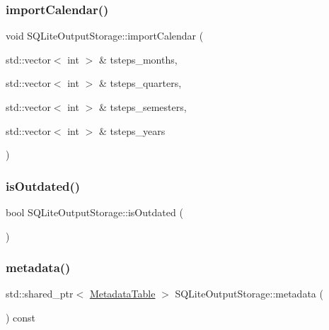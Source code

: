 \subsubsection{\texorpdfstring{importCalendar()}{importCalendar()}}
{\footnotesize\ttfamily void S\+Q\+Lite\+Output\+Storage\+::import\+Calendar (\begin{DoxyParamCaption}\item[{std\+::vector$<$ int $>$ \&}]{tsteps\+\_\+months,  }\item[{std\+::vector$<$ int $>$ \&}]{tsteps\+\_\+quarters,  }\item[{std\+::vector$<$ int $>$ \&}]{tsteps\+\_\+semesters,  }\item[{std\+::vector$<$ int $>$ \&}]{tsteps\+\_\+years }\end{DoxyParamCaption})}

\mbox{\label{class_s_q_lite_output_storage_adad2107c8e0ed61de81afa4bad915679}} 
\subsubsection{\texorpdfstring{isOutdated()}{isOutdated()}}
{\footnotesize\ttfamily bool S\+Q\+Lite\+Output\+Storage\+::is\+Outdated (\begin{DoxyParamCaption}{ }\end{DoxyParamCaption})\hspace{0.3cm}{\ttfamily [inline]}}

\mbox{\label{class_s_q_lite_output_storage_a168924d56024d59c38f6ff7f383a92f2}} 
\subsubsection{\texorpdfstring{metadata()}{metadata()}}
{\footnotesize\ttfamily std\+::shared\+\_\+ptr$<$ \mbox{\hyperlink{class_metadata_table}{Metadata\+Table}} $>$ S\+Q\+Lite\+Output\+Storage\+::metadata (\begin{DoxyParamCaption}{ }\end{DoxyParamCaption}) const}

\mbox{\label{class_s_q_lite_output_storage_accb747707fd50419cea2568acb3f68ba}} 
